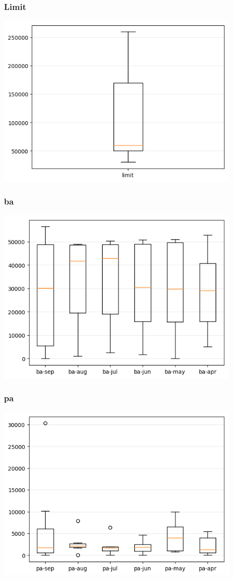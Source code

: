 \documentclass[a4paper]{article}
\begin{document}
\subsubsection{Limit}
\includegraphics[width=0.9\textwidth]{../Code/boxPlotsGemma/boxplots/limit.png}


\subsubsection{ba}
\includegraphics[width=0.9\textwidth]{../Code/boxPlotsGemma/boxplots/ba.png}


\subsubsection{pa}
\includegraphics[width=0.9\textwidth]{../Code/boxPlotsGemma/boxplots/pa.png}
\end{document}
